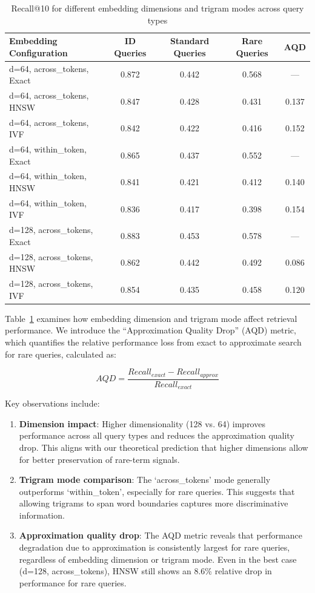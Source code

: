 \documentclass[sigconf,review]{acmart}
\begin{document}
\begin{table}[t]
\caption{Recall@10 for different embedding dimensions and trigram modes across query types}
\label{tab:embedding_configs}
\centering
\begin{tabular}{lcccc}
\toprule
Embedding Configuration & ID Queries & Standard Queries & Rare Queries & AQD \\
\midrule
d=64, across\_tokens, Exact & 0.872 & 0.442 & 0.568 & --- \\
d=64, across\_tokens, HNSW & 0.847 & 0.428 & 0.431 & 0.137 \\
d=64, across\_tokens, IVF & 0.842 & 0.422 & 0.416 & 0.152 \\
d=64, within\_token, Exact & 0.865 & 0.437 & 0.552 & --- \\
d=64, within\_token, HNSW & 0.841 & 0.421 & 0.412 & 0.140 \\
d=64, within\_token, IVF & 0.836 & 0.417 & 0.398 & 0.154 \\
d=128, across\_tokens, Exact & 0.883 & 0.453 & 0.578 & --- \\
d=128, across\_tokens, HNSW & 0.862 & 0.442 & 0.492 & 0.086 \\
d=128, across\_tokens, IVF & 0.854 & 0.435 & 0.458 & 0.120 \\
\bottomrule
\end{tabular}
\end{table}

Table~\ref{tab:embedding_configs} examines how embedding dimension and trigram mode affect retrieval performance. We introduce the ``Approximation Quality Drop'' (AQD) metric, which quantifies the relative performance loss from exact to approximate search for rare queries, calculated as:

\begin{equation}
AQD = \frac{Recall_{exact} - Recall_{approx}}{Recall_{exact}}
\end{equation}

Key observations include:

\begin{enumerate}
    \item \textbf{Dimension impact}: Higher dimensionality (128 vs. 64) improves performance across all query types and reduces the approximation quality drop. This aligns with our theoretical prediction that higher dimensions allow for better preservation of rare-term signals.
    
    \item \textbf{Trigram mode comparison}: The `across\_tokens' mode generally outperforms `within\_token', especially for rare queries. This suggests that allowing trigrams to span word boundaries captures more discriminative information.
    
    \item \textbf{Approximation quality drop}: The AQD metric reveals that performance degradation due to approximation is consistently largest for rare queries, regardless of embedding dimension or trigram mode. Even in the best case (d=128, across\_tokens), HNSW still shows an 8.6\% relative drop in performance for rare queries.
\end{enumerate}
\end{document}
